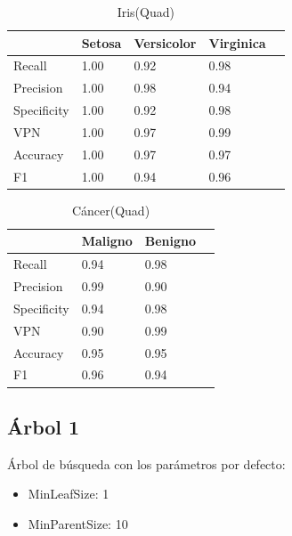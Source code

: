 \documentclass[a4paper,openwrite,12pt]{article}
\begin{document}
\begin{table}[H]
\centering
\begin{tabular}{@{}lllll@{}}
\toprule
            & Setosa & Versicolor & Virginica &  \\ \midrule
Recall      & 1.00   & 0.92       & 0.98      &  \\
Precision   & 1.00   & 0.98       & 0.94      &  \\
Specificity & 1.00   & 0.92       & 0.98      &  \\
VPN         & 1.00   & 0.97       & 0.99      &  \\
Accuracy    & 1.00   & 0.97       & 0.97      &  \\
F1          & 1.00   & 0.94       & 0.96      &  \\ \bottomrule
\end{tabular}
\caption{Iris(Quad)}
\end{table}


\begin{table}[H]
\centering
\begin{tabular}{@{}llll@{}}
\toprule
            & Maligno & Benigno &  \\ \midrule
Recall      & 0.94    & 0.98    &  \\
Precision   & 0.99   & 0.90    &  \\
Specificity & 0.94    & 0.98    &  \\
VPN         & 0.90    & 0.99    &  \\
Accuracy    & 0.95    & 0.95    &  \\
F1          & 0.96    & 0.94    &  \\ \bottomrule
\end{tabular}
\caption{Cáncer(Quad)}
\end{table}



\subsection{Árbol 1}

Árbol de búsqueda con los parámetros por defecto:

\begin{itemize}
    \item MinLeafSize: 1
    \item MinParentSize: 10
\end{itemize}
\end{document}
